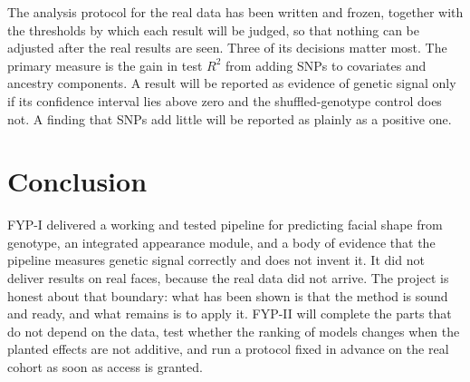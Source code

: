The analysis protocol for the real data has been written and frozen, together with the thresholds by which each result will be judged, so that nothing can be adjusted after the real results are seen. Three of its decisions matter most. The primary measure is the gain in test $R^2$ from adding SNPs to covariates and ancestry components. A result will be reported as evidence of genetic signal only if its confidence interval lies above zero and the shuffled-genotype control does not. A finding that SNPs add little will be reported as plainly as a positive one.

\section{Conclusion}
FYP-I delivered a working and tested pipeline for predicting facial shape from genotype, an integrated appearance module, and a body of evidence that the pipeline measures genetic signal correctly and does not invent it. It did not deliver results on real faces, because the real data did not arrive. The project is honest about that boundary: what has been shown is that the method is sound and ready, and what remains is to apply it. FYP-II will complete the parts that do not depend on the data, test whether the ranking of models changes when the planted effects are not additive, and run a protocol fixed in advance on the real cohort as soon as access is granted.
